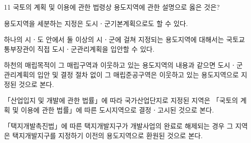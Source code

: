 \begin{question}{11}
국토의 계획 및 이용에 관한 법령상 용도지역에 관한 설명으로 옳은 것은?
\begin{choices}
  \item 용도지역을 세분하는 지정은 도시ㆍ군기본계획으로도 할 수 있다.
  \item 하나의 시ㆍ도 안에서 둘 이상의 시ㆍ군에 걸쳐 지정되는 용도지역에 대해서는 국토교통부장관이 직접 도시ㆍ군관리계획을 입안할 수 있다.
  \item 하천의 매립목적이 그 매립구역과 이웃하고 있는 용도지역의 내용과 같으면 도시ㆍ군관리계획의 입안 및 결정 절차 없이 그 매립준공구역은 이웃하고 있는 용도지역으로 지정된 것으로 본다.
  \item 「산업입지 및 개발에 관한 법률」에 따라 국가산업단지로 지정된 지역은 「국토의 계획 및 이용에 관한 법률」에 따른 도시지역으로 결정ㆍ고시된 것으로 본다.
  \item 「택지개발촉진법」에 따른 택지개발지구가 개발사업의 완료로 해제되는 경우 그 지역은 택지개발지구를 지정하기 이전의 용도지역으로 환원된 것으로 본다.
\end{choices}
\end{question}
